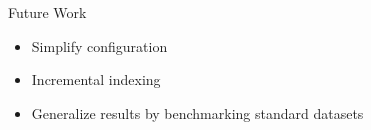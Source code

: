 \documentclass[compress]{beamer}
\begin{document}
		\begin{frame}{Future Work}
			\begin{itemize}
				\item Simplify configuration
				\item Incremental indexing
				\item Generalize results by benchmarking standard datasets
			\end{itemize}
		\end{frame}
	
	\section*{}
	
	\frame{\titlepage}
\end{document}
